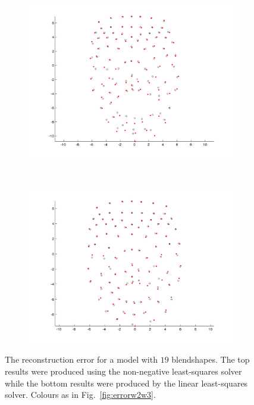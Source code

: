 \begin{figure}[htbp!]
\begin{subfigure}[b]{0.3\textwidth}
        \end{subfigure}%
        ~ %
        \begin{subfigure}[b]{0.3\textwidth}
                \includegraphics[trim = 10mm 0mm 10mm 0mm,clip,width=\textwidth]{img/weights/3D/19blends/w3_frame400_blends19.png}
        \end{subfigure}
        ~ %
        \begin{subfigure}[b]{0.3\textwidth}
                \includegraphics[trim = 10mm 0mm 10mm 0mm,clip,width=\textwidth]{img/weights/3D/19blends/w3_frame600_blends19.png} 
        \end{subfigure}
        \caption{The reconstruction error for a model with $19$ blendshapes. The top results were produced using the non-negative least-squares solver while the bottom results were produced by the linear least-squares solver. Colours as in Fig.~\ref{fig:errorw2w3}.}\label{fig:19blends}
\end{figure}

